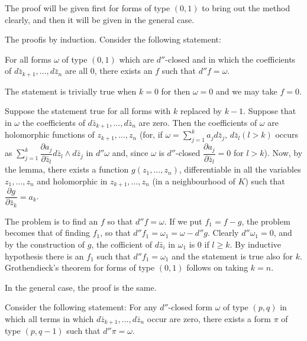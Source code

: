 \medskip
{}
The proof will be given first for forms of type $(0,1)$ to bring out
the method clearly, and then it will be given in the general case. 

The proof\pageoriginale is by induction. Consider the following
statement:

For all forms $\omega$ of type $(0,1)$ which are $d''$-closed and in
which the coefficients of $d \bar{z}_{k+1}, \ldots, d \bar{z}_n$ are
all 0, there exists an $f$ such that $d''f = \omega$.

The statement is trivially true when $k=0$ for then $\omega =0$ and we
may take $f=0$.

Suppose the statement true for all forms with $k$ replaced by
$k-1$. Suppose that in $\omega$ the coefficients of $d\bar{z}_{k+1},
\ldots, d\bar{z}_n$ are zero. Then the coefficients of $\omega$ are
holomorphic functions of $z_{k+1}, \ldots, z_n$ (for, if $\omega =
\sum\limits^k_{j=1} a_j d \bar{z}_j$, $d\bar{z}_l(l>k)$ occurs as
$\sum\limits^k_{j=1} \dfrac{\partial a_j}{\partial \bar{z}_l}
d\bar{z}_l \wedge d \bar{z}_j$ in $d''\omega$ and, since $\omega$ is
$d''$-closed $\dfrac{\partial a_j}{\partial \bar{z}_l}=0$ for
$l>k$). Now, by the lemma, there exists a function $g(z_1, \ldots,
z_n)$, differentiable in all the variables $z_1, \ldots, z_n$ and
holomorphic in $z_{k+1}, \ldots, z_n$ (in a neighbourhood of $K$) such
that $\dfrac{\partial g}{\partial \bar{z}_k} = a_k$. 

The problem is to find an $f$ so that $d'' f = \omega$. If we put $f_1
=f -g$, the problem becomes that of finding $f_1$, so that $d''f_1 =
\omega_1 = \omega - d''g$. Clearly $d'' \omega_1 = 0$, and by the
construction of $g$, the cofficient of $d\bar{z}_i$ in $\omega_1$ is
$0$ if $l \geq k$. By inductive hypothesis there is an $f_1$ such that
$d'' f_1 = \omega_1$ and the statement is true also for
$k$. Grothendieck's theorem for forms of type $(0,1)$ follows on
taking $k=n$. 

In the general case, the proof is the same.

Consider the following statement: For any $d''$-closed form $\omega$
of type $(p,q)$ in which all terms in which $d \bar{z}_{k+1}, \ldots,
d \bar{z}_n$ occur are zero, there exists a form $\pi$ of type $(p,
q-1)$ such that $d'' \pi = \omega$. 

